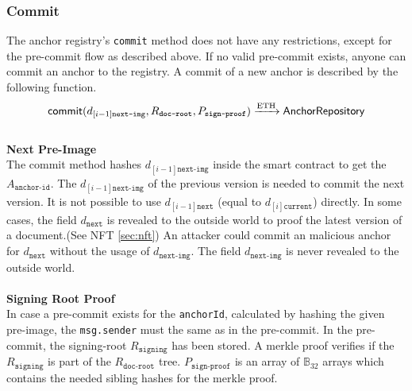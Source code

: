 \subsubsection{Commit}
The anchor registry's \texttt{commit} method does not have any restrictions, except for the pre-commit flow as described above. If no valid pre-commit exists, anyone can commit an anchor to the registry. A commit of a new anchor is described by the following function. 
\begin{equation}\\
    \mathsf{commit}(d_{[i-1]\texttt{next-img}},R_{\texttt{doc-root}},P_{\texttt{sign-proof}}) \xrightarrow[]{\text{ETH}} \mathsf{AnchorRepository}
\end{equation}\\
\textbf{Next Pre-Image }\\
The commit method hashes $d_{[i−1]\texttt{next-img}}$ inside the smart contract to get the $A_{\texttt{anchor-id}}$. The $d_{[i−1]\texttt{next-img}}$ of the previous version is needed to commit the next version. It is not possible to use $d_{[i−1]\texttt{next}}$ (equal to $d_{[i]\texttt{current}}$) directly. In some cases, the field  $d_{\texttt{next}}$ is revealed to the outside world to proof the latest version of a document.(See NFT \ref{sec:nft}) An attacker could commit an malicious anchor for $d_{\texttt{next}}$ without the usage of $d_{\texttt{next-img}}$. The field $d_{\texttt{next-img}}$ is never revealed to the outside world. \\
\\
\textbf{Signing Root Proof }\\
In case a pre-commit exists for the \texttt{anchorId}, calculated by hashing the given pre-image, the \texttt{msg.sender} must the same as in the pre-commit. In the pre-commit, the signing-root $R_{\texttt{signing}}$ has been stored. A merkle proof verifies if the $R_{\texttt{signing}}$ is part of the $R_{\texttt{doc-root}}$ tree. $P_{\texttt{sign-proof}}$ is an array of $\mathbb{B}_{32}$ arrays which contains the needed sibling hashes for the merkle proof. 





